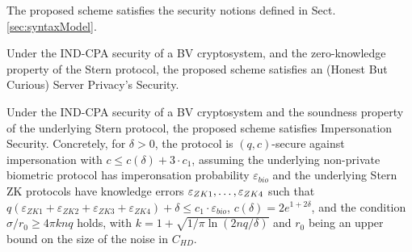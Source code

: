 \begin{description}
\begin{enumerate}
	\end{enumerate}
	The proposed scheme satisfies the security notions defined in Sect. \ref{sec:syntaxModel}.
	\begin{theorem}
		\label{theo:server}
		Under the IND-CPA security of a BV cryptosystem, and the zero-knowledge
		property of the Stern protocol, the proposed scheme satisfies an (Honest But Curious) Server Privacy's Security.
	\end{theorem}
	\begin{theorem}
		\label{theo:client}
		Under the IND-CPA security of a BV cryptosystem and the soundness
		property of the underlying Stern protocol, the proposed scheme satisfies Impersonation Security. Concretely, for $\delta>0$, the protocol is $(q,c)$-secure against impersonation with $c \leq c(\delta) + 3 \cdot c_1$, assuming the underlying non-private biometric protocol has imperonsation probability $\varepsilon_{bio}$ and the underlying Stern ZK protocols have knowledge errors $\varepsilon_{ZK1},\ldots,\varepsilon_{ZK4}$ such that $q(\varepsilon_{ZK1}+\varepsilon_{ZK2} +
\varepsilon_{ZK3} + \varepsilon_{ZK4}) + \delta \leq c_1 \cdot \varepsilon_{bio}$, $c(\delta) = 2 e^{1+2\delta}$, and the condition $\sigma/r_0 \geq 4 \pi k n q$ holds, with $k = 1 + \sqrt{1/\pi \ln(2nq/\delta)}$ and $r_0$ being an upper bound on the size of the noise in $C_{HD}$.
	\end{theorem}

\end{description}

